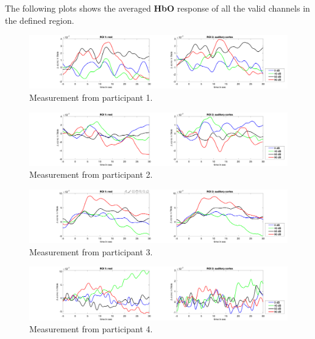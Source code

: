 \newpage

The following plots shows the averaged \textbf {HbO} response of all the valid channels in the defined region.



\begin{figure}[H]
  \centering
    \includegraphics[scale=.29]{bilder/ROI/sub_chang_s_HbO.png}
  \caption{Measurement from participant  1.}
\end{figure}

\begin{figure}[H]
  \centering
    \includegraphics[scale=.29]{bilder/ROI/sub_gleb2_s_HbO.png}
  \caption{Measurement from participant  2.}
\end{figure}

\begin{figure}[H]
  \centering
    \includegraphics[scale=.29]{bilder/ROI/sub_jonas_s_HbO.png}
  \caption{Measurement from participant  3.}
\end{figure}

\begin{figure}[H]
  \centering
    \includegraphics[scale=.29]{bilder/ROI/sub_lin_s_HbO.png}
  \caption{Measurement from participant  4.}
\end{figure}

